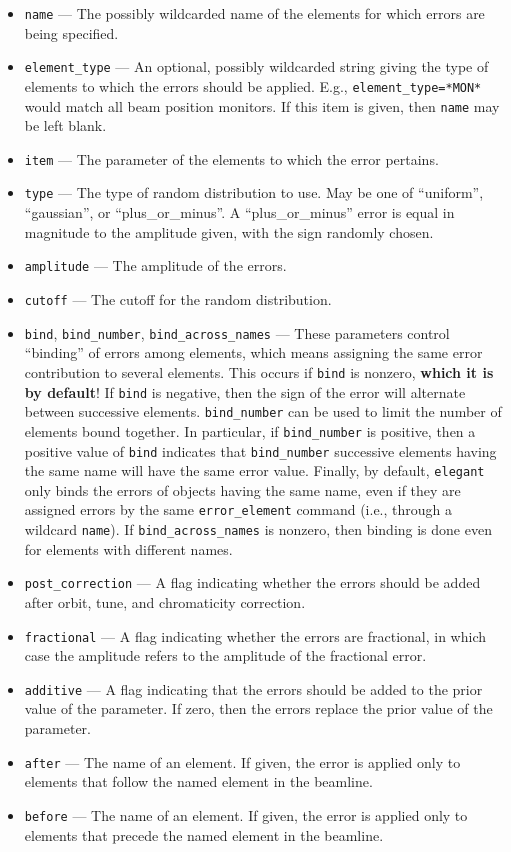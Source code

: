 \documentclass[11pt]{article}
\begin{document}
\begin{itemize}
\item \verb|name| --- The possibly wildcarded name of the elements for which errors are being specified.
\item \verb|element_type| --- An optional, possibly wildcarded string giving the type of elements to
 which the errors should be applied.  E.g., \verb|element_type=*MON*| would match all beam position monitors.
 If this item is given, then \verb|name| may be left blank.
\item \verb|item| --- The parameter of the elements to which the error pertains.
\item \verb|type| --- The type of random distribution to use.  May be one of ``uniform'', ``gaussian'', or ``plus\_or\_minus''.
A ``plus\_or\_minus'' error is equal in magnitude to the amplitude given, with the sign randomly chosen.
\item \verb|amplitude| --- The amplitude of the errors.
\item \verb|cutoff| --- The cutoff for the random distribution.
\item \verb|bind|, \verb|bind_number|, \verb|bind_across_names| ---
These parameters control ``binding'' of errors among elements, which
means assigning the same error contribution to several elements.  This
occurs if \verb|bind| is nonzero, {\bf which it is by default}! If \verb|bind| is negative, then the
sign of the error will alternate between successive elements.
\verb|bind_number| can be used to limit the number of elements bound
together. In particular, if \verb|bind_number| is positive, then a
positive value of \verb|bind| indicates that \verb|bind_number|
successive elements having the same name will have the same error
value.  Finally, by default, {\tt elegant} only binds the errors of
objects having the same name, even if they are assigned errors by 
the same \verb|error_element| command (i.e., through a wildcard \verb|name|).
If \verb|bind_across_names| is nonzero, then binding is done even for elements
with different names.

\item \verb|post_correction| --- A flag indicating whether the errors should be added after orbit, tune, and chromaticity correction.
\item \verb|fractional| --- A flag indicating whether the errors are fractional, in which case the amplitude refers to
the amplitude of the fractional error.
\item \verb|additive| --- A flag indicating that the errors should be added to the prior value of the
parameter.  If zero, then the errors replace the prior value of the parameter.
\item \verb|after| --- The name of an element.  If given, the error is applied only to elements
 that follow the named element in the beamline.
\item \verb|before| --- The name of an element.  If given, the error is applied only to elements
 that precede the named element in the beamline.
\end{itemize}
\end{document}
